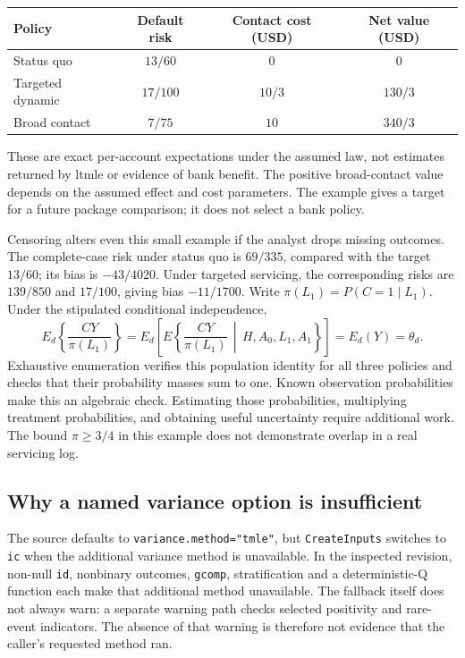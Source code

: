 \begin{center}\small
\begin{tabular}{lccc}
\toprule
Policy & Default risk & Contact cost (USD) & Net value (USD)\\
\midrule
Status quo & $13/60$ & $0$ & $0$\\
Targeted dynamic & $17/100$ & $10/3$ & $130/3$\\
Broad contact & $7/75$ & $10$ & $340/3$\\
\bottomrule
\end{tabular}\end{center}
These are exact per-account expectations under the assumed law, not estimates
returned by ltmle or evidence of bank benefit. The positive broad-contact value
depends on the assumed effect and cost parameters. The example gives a target
for a future package comparison; it does not select a bank policy.
\citep{exec23_ltmle_exact}

Censoring alters even this small example if the analyst drops missing outcomes.
The complete-case risk under status quo is $69/335$, compared with the target
$13/60$; its bias is $-43/4020$. Under targeted servicing, the corresponding
risks are $139/850$ and $17/100$, giving bias $-11/1700$. Write
$\pi(L_1)=P(C=1\mid L_1)$. Under the stipulated conditional independence,
\begin{equation}
 E_d\!\left\{\frac{CY}{\pi(L_1)}\right\}
 =E_d\!\left[E\!\left\{\frac{CY}{\pi(L_1)}\,
          \middle|\,H,A_0,L_1,A_1\right\}\right]
 =E_d(Y)=\theta_d.
 \label{exec23:ltmle-censoring}
\end{equation}
Exhaustive enumeration verifies this population identity for all three
policies and checks that their probability masses sum to one. Known
observation probabilities make this an algebraic check. Estimating those
probabilities, multiplying treatment probabilities, and obtaining useful
uncertainty require additional work. The bound $\pi\geq3/4$ in this example
does not demonstrate overlap in a real servicing log.
\citep{exec23_ltmle_exact}

\subsection{Why a named variance option is insufficient}

The source defaults to \texttt{variance.method="tmle"}, but
\texttt{CreateInputs} switches to \texttt{ic} when the additional variance
method is unavailable. In the inspected revision, non-null \texttt{id},
nonbinary outcomes, \texttt{gcomp}, stratification and a deterministic-Q
function each make that additional method unavailable. The fallback itself
does not always warn: a separate warning path checks selected positivity and
rare-event indicators. The absence of that warning is therefore not evidence
that the caller's requested method ran.\citep{exec23_ltmle_source}

